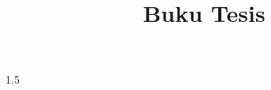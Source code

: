 \documentclass[12pt, a4paper,twoside,opneany]{report}
\title{Buku Tesis}
\begin{document}
	
	
	
	\begin{spacing}{1.5}
		
		
		\clearpage
		
		
		\clearpage
		
		
		\clearpage
		
		
		\clearpage
		
		
		\clearpage
		
		
		\clearpage
		
		
		\clearpage
		
	\end{spacing}
	
	\DaftarPustaka
	
	\DaftarRiwayatHidup
\end{document}
